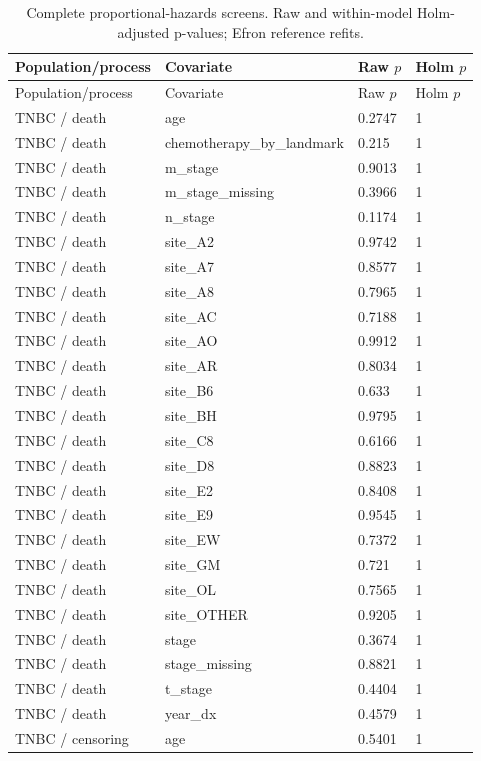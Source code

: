 \documentclass[12pt,letterpaper]{article}
\begin{document}
\begin{longtable}{p{1.55in}p{2.25in}p{0.9in}p{1.1in}}
\caption{Complete proportional-hazards screens. Raw and within-model Holm-adjusted p-values; Efron reference refits.}\\
\toprule
Population/process & Covariate & Raw $p$ & Holm $p$ \\
\midrule\endfirsthead
\toprule
Population/process & Covariate & Raw $p$ & Holm $p$ \\
\midrule\endhead
\bottomrule\endfoot
TNBC / death & age & 0.2747 & 1 \\
TNBC / death & chemotherapy\_by\_landmark & 0.215 & 1 \\
TNBC / death & m\_stage & 0.9013 & 1 \\
TNBC / death & m\_stage\_missing & 0.3966 & 1 \\
TNBC / death & n\_stage & 0.1174 & 1 \\
TNBC / death & site\_A2 & 0.9742 & 1 \\
TNBC / death & site\_A7 & 0.8577 & 1 \\
TNBC / death & site\_A8 & 0.7965 & 1 \\
TNBC / death & site\_AC & 0.7188 & 1 \\
TNBC / death & site\_AO & 0.9912 & 1 \\
TNBC / death & site\_AR & 0.8034 & 1 \\
TNBC / death & site\_B6 & 0.633 & 1 \\
TNBC / death & site\_BH & 0.9795 & 1 \\
TNBC / death & site\_C8 & 0.6166 & 1 \\
TNBC / death & site\_D8 & 0.8823 & 1 \\
TNBC / death & site\_E2 & 0.8408 & 1 \\
TNBC / death & site\_E9 & 0.9545 & 1 \\
TNBC / death & site\_EW & 0.7372 & 1 \\
TNBC / death & site\_GM & 0.721 & 1 \\
TNBC / death & site\_OL & 0.7565 & 1 \\
TNBC / death & site\_OTHER & 0.9205 & 1 \\
TNBC / death & stage & 0.3674 & 1 \\
TNBC / death & stage\_missing & 0.8821 & 1 \\
TNBC / death & t\_stage & 0.4404 & 1 \\
TNBC / death & year\_dx & 0.4579 & 1 \\
TNBC / censoring & age & 0.5401 & 1 \\

\end{longtable}
\end{document}
